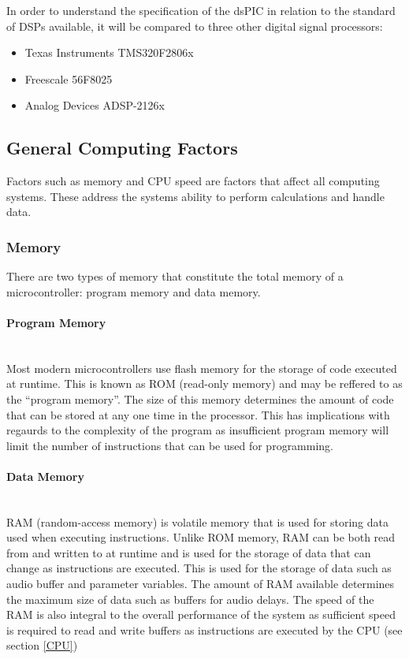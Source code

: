 \documentclass{scrartcl}
\begin{document}
    In order to understand the specification of the dsPIC in relation to the
    standard of DSPs available, it will be compared to three other digital signal
    processors:
    \begin{itemize}
        \item Texas Instruments TMS320F2806x
        \item Freescale 56F8025
        \item Analog Devices ADSP-2126x
    \end{itemize}

    \subsection{General Computing Factors}
    Factors such as memory and CPU speed are factors that affect all computing
    systems. These address the systems ability to perform calculations and
    handle data.

    \subsubsection{Memory}
    There are two types of memory that constitute the total memory of a
    microcontroller: program memory and data memory.

    \paragraph{Program Memory}~\\
    Most modern microcontrollers use flash memory for the storage of code
    executed at runtime. This is known as ROM (read-only memory) and may be
    reffered to as the ``program memory''. The size of this memory determines
    the amount of code that can be stored at any one time in the processor.
    This has implications with regaurds to the complexity of the program as
    insufficient program memory will limit the number of instructions that can
    be used for programming.

    \paragraph{Data Memory}~\\
    RAM (random-access memory) is volatile memory that is used for storing data
    used when executing instructions. Unlike ROM memory, RAM can be both read
    from and written to at runtime and is used for the storage of data that can
    change as instructions are executed. This is used for the storage of data
    such as audio buffer and parameter variables. The amount of RAM available
    determines the maximum size of data such as buffers for audio delays. The
    speed of the RAM is also integral to the overall performance of the system
    as sufficient speed is required to read and write buffers as instructions
    are executed by the CPU (see section \ref{CPU})
\end{document}

